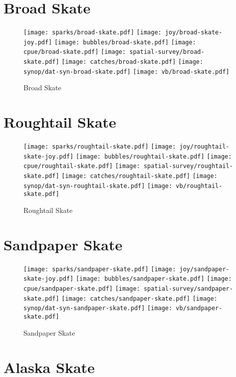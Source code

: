 \section{Broad Skate}

\begin{figure}[htbp]
\centering
\texttt{[image: sparks/broad-skate.pdf]}
\texttt{[image: joy/broad-skate-joy.pdf]}
\texttt{[image: bubbles/broad-skate.pdf]}
\texttt{[image: cpue/broad-skate.pdf]}
\texttt{[image: spatial-survey/broad-skate.pdf]}
\texttt{[image: catches/broad-skate.pdf]}
\texttt{[image: synop/dat-syn-broad-skate.pdf]}
\texttt{[image: vb/broad-skate.pdf]}
\caption{Broad Skate}
\end{figure}
\clearpage
\section{Roughtail Skate}

\begin{figure}[htbp]
\centering
\texttt{[image: sparks/roughtail-skate.pdf]}
\texttt{[image: joy/roughtail-skate-joy.pdf]}
\texttt{[image: bubbles/roughtail-skate.pdf]}
\texttt{[image: cpue/roughtail-skate.pdf]}
\texttt{[image: spatial-survey/roughtail-skate.pdf]}
\texttt{[image: catches/roughtail-skate.pdf]}
\texttt{[image: synop/dat-syn-roughtail-skate.pdf]}
\texttt{[image: vb/roughtail-skate.pdf]}
\caption{Roughtail Skate}
\end{figure}
\clearpage
\section{Sandpaper Skate}

\begin{figure}[htbp]
\centering
\texttt{[image: sparks/sandpaper-skate.pdf]}
\texttt{[image: joy/sandpaper-skate-joy.pdf]}
\texttt{[image: bubbles/sandpaper-skate.pdf]}
\texttt{[image: cpue/sandpaper-skate.pdf]}
\texttt{[image: spatial-survey/sandpaper-skate.pdf]}
\texttt{[image: catches/sandpaper-skate.pdf]}
\texttt{[image: synop/dat-syn-sandpaper-skate.pdf]}
\texttt{[image: vb/sandpaper-skate.pdf]}
\caption{Sandpaper Skate}
\end{figure}
\clearpage
\section{Alaska Skate}

